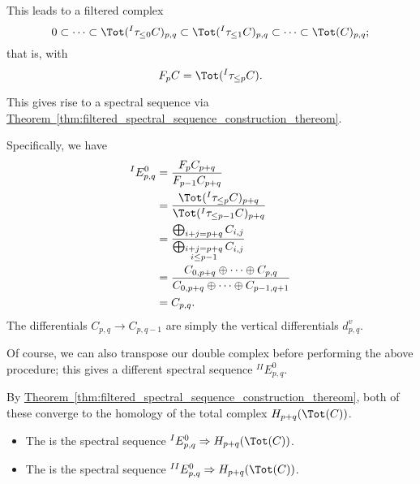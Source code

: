 \documentclass[main.tex]{subfiles}
\begin{document}
This leads to a filtered complex
\begin{equation*}
  0 \subset \cdots \subset \Tot(^{I}\tau_{\leq 0}C)_{p, q} \subset \Tot(^{I}\tau_{\leq 1}C)_{p, q} \subset \cdots \subset \Tot(C)_{p,q};
\end{equation*}
that is, with
\begin{equation*}
  F_{p}C = \Tot(^{I}\tau_{\leq p}C).
\end{equation*}

This gives rise to a spectral sequence via \hyperref[thm:filtered_spectral_sequence_construction_thereom]{Theorem~\ref*{thm:filtered_spectral_sequence_construction_thereom}}.

Specifically, we have
\begin{align*}
  ^{I}E^{0}_{p,q} &= \frac{F_{p}C_{p+q}}{F_{p-1}C_{p+q}} \\
  &= \frac{\Tot(^{I}\tau_{\leq p}C)_{p+q}}{\Tot(^{I}\tau_{\leq p-1}C)_{p+q}} \\
  &= \frac{\bigoplus_{\substack{i+j = p+q}} C_{i,j}}{\bigoplus_{\substack{i + j = p+q \\ i \leq p-1}}C_{i,j}} \\
  &= \frac{C_{0,p+q} \oplus \cdots \oplus C_{p, q}}{C_{0,p+q} \oplus \cdots \oplus C_{p-1, q+1}} \\
  &= C_{p, q}.
\end{align*}
The differentials $C_{p, q} \to C_{p, q-1}$ are simply the vertical differentials $d^{v}_{p,q}$.

Of course, we can also transpose our double complex before performing the above procedure; this gives a different spectral sequence $^{II}E^{0}_{p,q}$.

By \hyperref[thm:filtered_spectral_sequence_construction_thereom]{Theorem~\ref*{thm:filtered_spectral_sequence_construction_thereom}}, both of these converge to the homology of the total complex $H_{p+q}(\Tot(C))$.

\begin{definition}
  \label{def:spectral_sequences_associated_to_a_double_complex}
  \leavevmode
  \begin{itemize}
    \item The  is the spectral sequence $^{I}E^{0}_{p, q} \Rightarrow H_{p+q}(\Tot(C))$.

    \item The  is the spectral sequence $^{II}E^{0}_{p, q} \Rightarrow H_{p+q}(\Tot(C))$.
  \end{itemize}
\end{definition}
\end{document}
